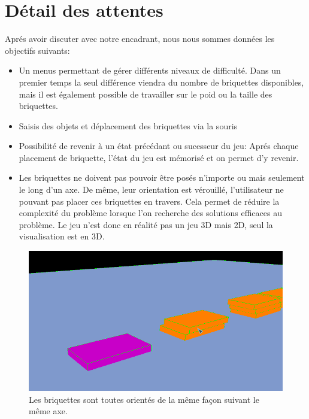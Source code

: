 \documentclass[frenchb,twoside]{EPURapport}
\begin{document}
\section{Détail des attentes}
    Aprés avoir discuter avec notre encadrant, nous nous sommes données les objectifs suivants:
    \begin{itemize}
        \item Un menus permettant de gérer différents niveaux de difficulté.
        Dans un premier temps la seul différence viendra du nombre de
        briquettes disponibles, mais il est également possible de travailler
        sur le poid ou la taille des briquettes.
        \item Saisis des objets et déplacement des briquettes via la souris
        \item Possibilité de revenir à un état précédant ou sucesseur du jeu:
        Aprés chaque placement de briquette, l'état du jeu est mémorisé et on
        permet d'y revenir.
        \item Les briquettes ne doivent pas pouvoir être posés n'importe ou
        mais seulement le long d'un axe. De même, leur orientation est
        vérouillé, l'utilisateur ne pouvant pas placer ces briquettes en
        travers. Cela permet de réduire la complexité du problème lorsque l'on
        recherche des solutions efficaces au problème.
        Le jeu n'est donc en réalité pas un jeu 3D mais 2D, seul la visualisation est en 3D.
        
    \end{itemize}
     \begin{figure}[h]
		\centering
        \includegraphics[width=16cm]{images/zoom_briquette.png}
        \caption{\label{fig:zoom_briquette}Les briquettes sont toutes orientés de la même façon suivant le même axe.}
    \end{figure}
\end{document}
